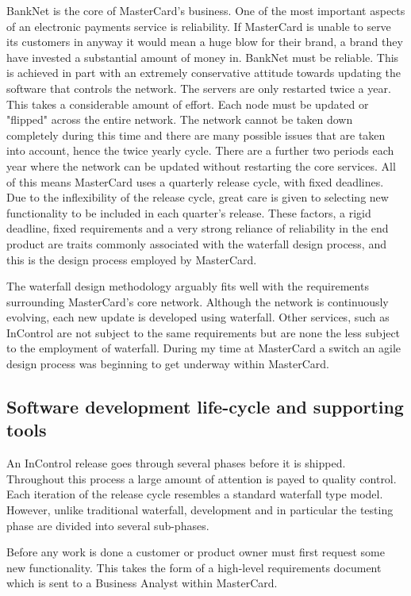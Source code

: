 \documentclass[a4paper, 11pt, titlepage]{article}
\begin{document}
BankNet is the core of MasterCard’s business. One of the most important aspects of an electronic payments service is reliability. If MasterCard is unable to serve its customers in anyway it would mean a huge blow for their brand, a brand they have invested a substantial amount of money in. BankNet must be reliable. This is achieved in part with an extremely conservative attitude towards updating the software that controls the network. The servers are only restarted twice a year. This takes a considerable amount of effort. Each node must be updated or "flipped" across the entire network. The network cannot be taken down completely during this time and there are many possible issues that are taken into account, hence the twice yearly cycle. There are a further two periods each year where the network can be updated without restarting the core services. All of this means MasterCard uses a quarterly release cycle, with fixed deadlines. Due to the inflexibility of the release cycle, great care is given to selecting new functionality to be included in each quarter’s release. These factors, a rigid deadline, fixed requirements and a very strong reliance of reliability in the end product are traits commonly associated with the waterfall design process, and this is the design process employed by MasterCard. 
 
The waterfall design methodology arguably fits well with the requirements surrounding MasterCard’s core network. Although the network is continuously evolving, each new update is developed using waterfall. Other services, such as InControl are not subject to the same requirements but are none the less subject to the employment of waterfall. During my time at MasterCard a switch an agile design process was beginning to get underway within MasterCard. 
 
\subsection{Software development life-cycle and supporting tools}

An InControl release goes through several phases before it is shipped. Throughout this process a large amount of attention is payed to quality control. Each iteration of the release cycle resembles a standard waterfall type model. However, unlike traditional waterfall, development and in particular the testing phase are divided into several sub-phases.

Before any work is done a customer or product owner must first request some new functionality. This takes the form of a high-level requirements document which is sent to a Business Analyst within MasterCard.
\end{document}
